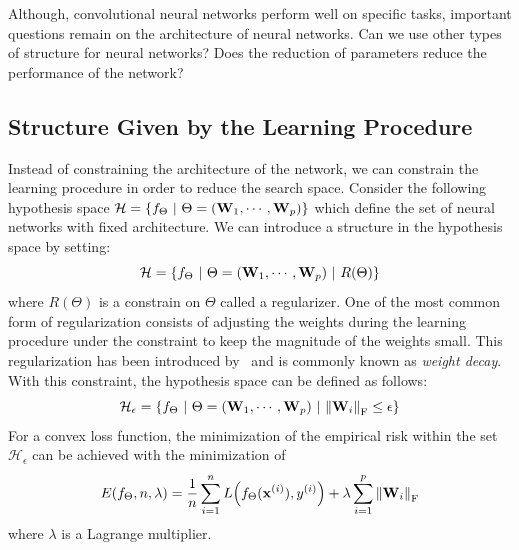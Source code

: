 Although, convolutional neural networks perform well on specific tasks, important questions remain on the architecture of neural networks. 
Can we use other types of structure for neural networks?  
Does the reduction of parameters reduce the performance of the network?


\subsection{Structure Given by the Learning Procedure}
\label{subsection:ch1-introducing_structured_into_the_learning_procedure}

Instead of constraining the architecture of the network, we can constrain the learning procedure in order to reduce the search space.
Consider the following hypothesis space $\mathcal{H} = \left\{ f_\Theta \ |\ \Theta = ( \Wmat_1, \cdots, \Wmat_p ) \right\}$ which define the set of neural networks with fixed architecture.
We can introduce a structure in the hypothesis space by setting:
\begin{equation}
  \mathcal{H} = \left\{ f_\Theta \ |\ \Theta = ( \Wmat_1, \cdots, \Wmat_p ) \ |\ R(\Theta) \right\} 
\end{equation}
where $R(\Theta)$ is a constrain on $\Theta$ called a regularizer.
One of the most common form of regularization consists of adjusting the weights during the learning procedure under the constraint to keep the magnitude of the weights small.
This regularization has been introduced by~\citet{tikhonov_arsenin_1977} and is commonly known as \emph{weight decay}.
With this constraint, the hypothesis space can be defined as follows:
\begin{equation}
  \mathcal{H_\epsilon} = \left\{ f_\Theta \ |\ \Theta = (\Wmat_1, \cdots, \Wmat_p) \ | \ \norm{\Wmat_i}_\mathrm{F} \leq \epsilon \right\} 
\end{equation}
For a convex loss function, the minimization of the empirical risk within the set $\mathcal{H}_\epsilon$ can be achieved with the minimization of
\begin{equation}
  E(f_\Theta, n, \lambda) = \frac{1}{n} \sum_{i = 1}^{n} L\left(f_\Theta(\xvec^{(i)}), y^{(i)} \right) + \lambda \sum_{i = 1}^{p} \norm{\Wmat_i}_\mathrm{F}
\end{equation}
where $\lambda$ is a Lagrange multiplier.

